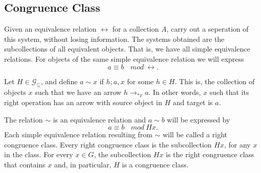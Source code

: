 \documentclass [12pt]{book}
\begin{document}
	\subsection{Congruence Class}

Given an equivalence relation $\leftrightarrow$ for a collection $A$, carry out a seperation of this system, without losing information. The systems obtained are the subcollections of all equivalent objects. That is, we have all simple equivalence relations. For objects of the same simple equivalence relation we will express $$a\equiv b~~~~mod~\leftrightarrow.$$

Let $H\in\mathcal{G}_{\subseteq}$, and define $a\sim x$ if $h;a,x$ for some $h\in H$. This is, the collection of objects $x$ such that we have an arrow $h\rightarrow_{*x} a$. In other words, $x$ such that its right operation has an arrow with source object in $H$ and target is $a$.

\begin{theorem}The relation $\sim$ is an equivalence relation and $a\sim b$ will be expressed by $$a\equiv b~~~~mod~Hx.$$ Each simple equivalence relation resulting from $\sim$ will be called a right congruence class. Every right congruence class is the subcollection $Hx$, for any $x$ in the class. For every $x\in G$, the subcollection $Hx$ is the right congruence class that contains $x$ and, in particular, $H$ is a congruence class.\end{theorem}
\end{document}
